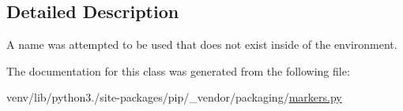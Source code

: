 \subsection{Detailed Description}
\begin{DoxyVerb}A name was attempted to be used that does not exist inside of the
environment.
\end{DoxyVerb}
 

The documentation for this class was generated from the following file\+:\begin{DoxyCompactItemize}
\item 
venv/lib/python3./site-\/packages/pip/\+\_\+vendor/packaging/\hyperlink{pip_2__vendor_2packaging_2markers_8py}{markers.\+py}\end{DoxyCompactItemize}
